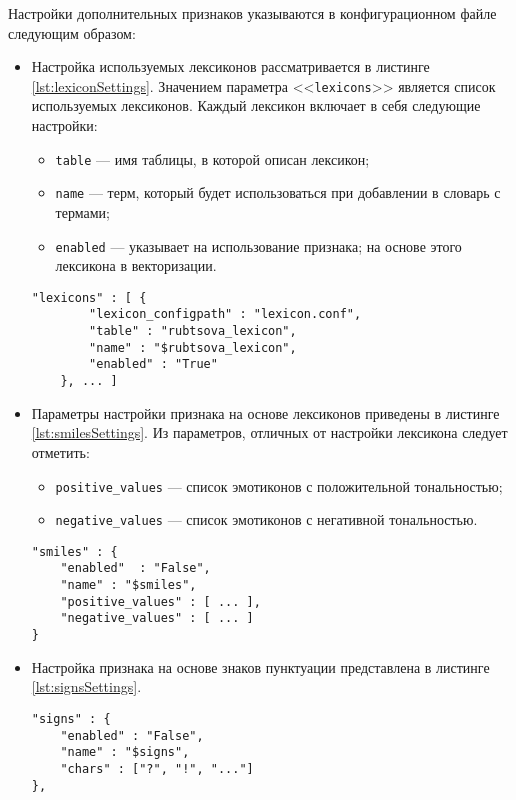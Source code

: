     Настройки дополнительных признаков указываются в конфигурационном файле
    следующим образом:
    \begin{itemize}
        \item Настройка используемых лексиконов рассматривается в листинге \ref{lst:lexiconSettings}.
            Значением параметра <<{\tt lexicons}>> является список используемых
            лексиконов. Каждый лексикон включает в себя следующие настройки:
            \begin{itemize}
                \item {\tt table} --- имя таблицы, в которой описан лексикон;
                \item {\tt name} --- терм, который будет использоваться при добавлении в словарь с термами;
                \item {\tt enabled} ---  указывает на использование признака;
                    на основе этого лексикона в векторизации.
            \end{itemize}
        \begin{lstlisting}[caption="Настройка используемых лексиконов", label={lst:lexiconSettings}]
"lexicons" : [ {
        "lexicon_configpath" : "lexicon.conf",
        "table" : "rubtsova_lexicon",
        "name" : "$rubtsova_lexicon",
        "enabled" : "True"
    }, ... ]
        \end{lstlisting}

        \item Параметры настройки признака на основе лексиконов приведены в листинге \ref{lst:smilesSettings}.
            Из параметров, отличных от настройки лексикона следует отметить:
            \begin{itemize}
                \item {\tt positive\_values} --- список эмотиконов с положительной тональностью;
                \item {\tt negative\_values} --- список эмотиконов с негативной тональностью.
            \end{itemize}
        \begin{lstlisting}[caption="Настройка признака на основе эмотиконов", label={lst:smilesSettings}]
"smiles" : {
    "enabled"  : "False",
    "name" : "$smiles",
    "positive_values" : [ ... ],
    "negative_values" : [ ... ]
}
        \end{lstlisting}
        \item Настройка признака на основе знаков пунктуации представлена в
            листинге \ref{lst:signsSettings}.
        \begin{lstlisting}[caption="Настройка признаков на основе знаков пунктуации", label={lst:signsSettings}]
"signs" : {
    "enabled" : "False",
    "name" : "$signs",
    "chars" : ["?", "!", "..."]
},
        \end{lstlisting}


\end{itemize}
